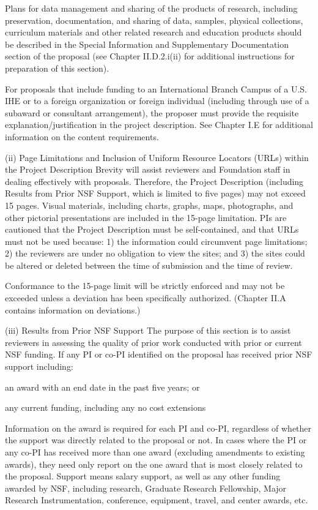 {Plans for data management and sharing of the products of research, including preservation, documentation, and sharing of data, samples, physical collections, curriculum materials and other related research and education products should be described in the Special Information and Supplementary Documentation section of the proposal (see Chapter II.D.2.i(ii) for additional instructions for preparation of this section).

For proposals that include funding to an International Branch Campus of a U.S. IHE or to a foreign organization or foreign individual (including through use of a subaward or consultant arrangement), the proposer must provide the requisite explanation/justification in the project description. See Chapter I.E for additional information on the content requirements.

(ii) Page Limitations and Inclusion of Uniform Resource Locators (URLs) within the Project Description
Brevity will assist reviewers and Foundation staff in dealing effectively with proposals. Therefore, the Project Description (including Results from Prior NSF Support, which is limited to five pages) may not exceed 15 pages. Visual materials, including charts, graphs, maps, photographs, and other pictorial presentations are included in the 15-page limitation. PIs are cautioned that the Project Description must be self-contained, and that URLs must not be used because: 1) the information could circumvent page limitations; 2) the reviewers are under no obligation to view the sites; and 3) the sites could be altered or deleted between the time of submission and the time of review.

Conformance to the 15-page limit will be strictly enforced and may not be exceeded unless a deviation has been specifically authorized. (Chapter II.A contains information on deviations.)

(iii) Results from Prior NSF Support
The purpose of this section is to assist reviewers in assessing the quality of prior work conducted with prior or current NSF funding. If any PI or co-PI identified on the proposal has received prior NSF support including:

an award with an end date in the past five years; or

any current funding, including any no cost extensions

Information on the award is required for each PI and co-PI, regardless of whether the support was directly related to the proposal or not. In cases where the PI or any co-PI has received more than one award (excluding amendments to existing awards), they need only report on the one award that is most closely related to the proposal. Support means salary support, as well as any other funding awarded by NSF, including research, Graduate Research Fellowship, Major Research Instrumentation, conference, equipment, travel, and center awards, etc.

}
